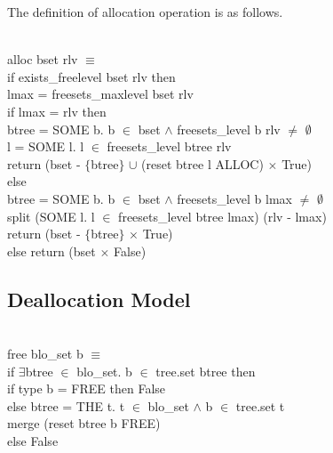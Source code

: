 The definition of allocation operation is as follows.

\begin{definition}  \\
	alloc bset rlv $\equiv$ \\
	\phantom{x} \hspace{10pt} if exists\_freelevel bset rlv then \\
	\phantom{x} \hspace{20pt} lmax = freesets\_maxlevel bset rlv \\
	\phantom{x} \hspace{20pt} if lmax = rlv then \\
	\phantom{x} \hspace{30pt} btree = SOME b. b $\in$ bset $\wedge$ freesets\_level b rlv $\ne$ $\emptyset$ \\
	\phantom{x} \hspace{30pt} l = SOME l. l $\in$ freesets\_level btree rlv \\
	\phantom{x} \hspace{30pt} return (bset - $\lbrace$btree$\rbrace$ $\cup$ (reset btree l ALLOC) $\times$ True) \\
	\phantom{x} \hspace{20pt} else \\
	\phantom{x} \hspace{30pt} btree = SOME b. b $\in$ bset $\wedge$ freesets\_level b lmax $\ne$ $\emptyset$ \\
	\phantom{x} \hspace{30pt} split (SOME l. l $\in$ freesets\_level btree lmax) (rlv - lmax) \\
	\phantom{x} \hspace{30pt} return (bset - $\lbrace$btree$\rbrace$ $\times$ True) \\
	\phantom{x} \hspace{10pt} else return (bset $\times$ False)
\end{definition}

\subsection{Deallocation Model}

\begin{definition}  \\
	free blo\_set b $\equiv$ \\
	\phantom{x} \hspace{10pt} if $\exists$btree $\in$ blo\_set. b $\in$ tree.set btree then \\
	\phantom{x} \hspace{20pt} if type b = FREE then False \\
	\phantom{x} \hspace{20pt} else btree = THE t. t $\in$ blo\_set $\wedge$ b $\in$ tree.set t \\
	\phantom{x} \hspace{40pt} merge (reset btree b FREE) \\
	\phantom{x} \hspace{10pt} else False
\end{definition}

